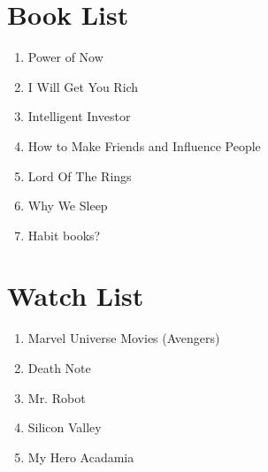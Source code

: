 \documentclass[10pt]{article}
\begin{document}
\section*{Book List}
\begin{enumerate}
    \item Power of Now
    \item I Will Get You Rich
    \item Intelligent Investor
    \item How to Make Friends and Influence People
    \item Lord Of The Rings
    \item Why We Sleep
    \item Habit books?
\end{enumerate}

\section*{Watch List}
\begin{enumerate}
    \item Marvel Universe Movies (Avengers)
    \item Death Note
    \item Mr. Robot
    \item Silicon Valley
    \item My Hero Acadamia
\end{enumerate}
\end{document}
